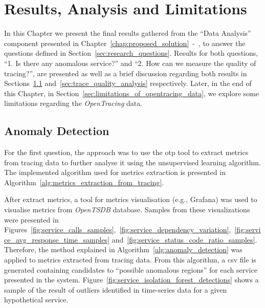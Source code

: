 \glsresetall
\chapter{Results, Analysis and Limitations}
\label{chap:results_analysis_and_limitations}

In this Chapter we present the final results gathered from the ``Data Analysis'' component presented in Chapter~\ref{chap:proposed_solution}~-~, to answer the questions defined in Section~\ref{sec:research_questions}. Results for both questions, ``1. Is there any anomalous service?'' and ``2. How can we measure the quality of tracing?'', are presented as well as a brief discussion regarding both results in Sections~\ref{sec:anomaly_detection} and~\ref{sec:trace_quality_analysis} respectively. Later, in the end of this Chapter, in Section~\ref{sec:limitations_of_opentracing_data}, we explore some limitations regarding the \emph{OpenTracing} data.

\section{Anomaly Detection}
\label{sec:anomaly_detection}

For the first question, the approach was to use the \gls{otp} tool to extract metrics from tracing data to further analyse it using the unsupervised learning algorithm. The implemented algorithm used for metrics extraction is presented in Algorithm~\ref{alg:metrics_extraction_from_tracing}.

After extract metrics, a tool for metrics visualisation (e.g., Grafana) was used to visualise metrics from \emph{OpenTSDB} database. Samples from these visualizations were presented in Figures~\ref{fig:service_calls_samples},~\ref{fig:service_dependency_variation},~\ref{fig:service_avg_response_time_samples} and~\ref{fig:service_status_code_ratio_samples}. Therefore, the method explained in Algorithm~\ref{alg:anomaly_detection} was applied to metrics extracted from tracing data. From this algorithm, a \gls{csv} file is generated containing candidates to ``possible anomalous regions'' for each service presented in the system. Figure~\ref{fig:service_isolation_forest_detections} shows a sample of the result of outliers identified in time-series data for a given hypothetical service.



